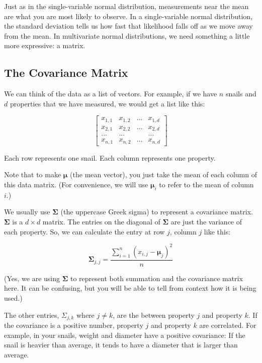 Just as in the single-variable normal distribution, measurements near the mean are what you are most likely to observe.
In a single-variable normal distribution, the standard deviation tells us how fast that likelihood falls off as we move away from the mean.
In multivariate normal distributions, we need something a little more expressive: a matrix.

\subsection{The Covariance Matrix}

We can think of the data as a list of vectors.
For example, if we have $n$ snails and $d$ properties that we have measured, we would get a list like this:

$$\begin{bmatrix}
x_{1,1} & x_{1,2} & ... & x_{1,d} \\
x_{2,1} & x_{2,2} & ... & x_{2,d} \\
... & ... & &... \\
x_{n,1} & x_{n,2} & ... & x_{n,d}\end{bmatrix}$$

Each row represents one snail. Each column represents one property.

Note that to make $\boldsymbol\mu$ (the mean vector), you just take the mean of each column of this data matrix. (For convenience, we will use $\boldsymbol\mu_i$ to refer to the mean of column $i$.)

We usually use $\mathbf{\Sigma}$ (the uppercase Greek sigma) to represent a covariance matrix. $\mathbf{\Sigma}$ is a $d \times d$ matrix.
The entries on the diagonal of $\mathbf{\Sigma}$ are just the variance of each property.
So, we can calculate the entry at row $j$, column $j$ like this:

$$\mathbf{\Sigma}_{j,j} = \frac{\sum_{i=1}^{n}(x_{i,j} - \boldsymbol\mu_j)^2}{n}$$

(Yes, we are using $\mathbf{\Sigma}$ to represent both summation and the covariance matrix here.
It can be confusing, but you will be able to tell from context how it is being used.)

The other entries, $\Sigma_{j,k}$ where $j \neq k$, are the  between property $j$ and property $k$.
If the covariance is a positive number, property $j$ and property $k$ are correlated. For example, in your snails, weight and diameter have a positive covariance: If the snail is heavier than average, it tends to have a diameter that is larger than average.

